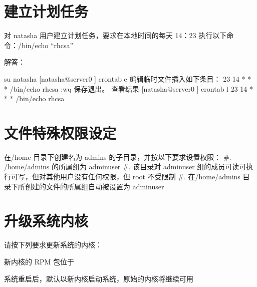 \documentclass[letterpaper,10pt,english]{sphinxmanual}
\begin{document}
\section{建立计划任务}
\label{\detokenize{rhcsa/rhcsa_7:id4}}
对 natasha 用户建立计划任务，要求在本地时间的每天 14：23 执行以下命令：/bin/echo
“rhcsa”

解答：

%
\begin{sphinxVerbatim}\PYGZsh{} su \PYGZhy{} natasha
[natasha@server0 \PYGZti{}]\PYGZdl{} crontab \PYGZhy{}e 编辑临时文件插入如下条目：
23 14 * * * /bin/echo \PYGZdq{}rhcsa\PYGZdq{}
:wq 保存退出。
查看结果
[natasha@server0 \PYGZti{}]\PYGZdl{} crontab \PYGZhy{}l
23 14 * * * /bin/echo \PYGZdq{}rhcsa\PYGZdq{}
\end{sphinxVerbatim}


\section{文件特殊权限设定}
\label{\detokenize{rhcsa/rhcsa_7:id5}}
在/home 目录下创建名为 admins 的子目录，并按以下要求设置权限：
\#. /home/admins 的所属组为 adminuser
\#. 该目录对 adminuser 组的成员可读可执行可写，但对其他用户没有任何权限，但 root 不受限制
\#. 在/home/admins 目录下所创建的文件的所属组自动被设置为 adminuser

%
\begin{sphinxVerbatim}[commandchars=\\\{\}]
\PYG{p}{[} \PYG{p}{]}
\PYG{p}{[} \PYG{p}{]}
\PYG{p}{[} \PYG{p}{]}
\end{sphinxVerbatim}


\section{升级系统内核}
\label{\detokenize{rhcsa/rhcsa_7:id6}}
请按下列要求更新系统的内核：

新内核的 RPM 包位于

系统重启后，默认以新内核启动系统，原始的内核将继续可用
\end{document}
